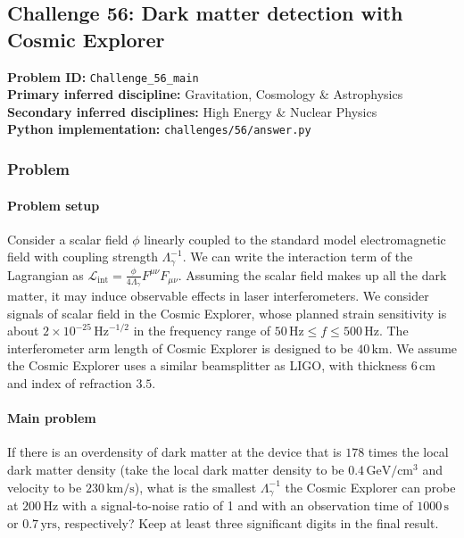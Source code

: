 \subsection[Challenge 56: Dark matter detection with Cosmic Explorer]{Challenge 56: Dark matter detection with Cosmic Explorer}
\textbf{Problem ID:} \texttt{Challenge\_56\_main}\\
\textbf{Primary inferred discipline:} Gravitation, Cosmology \& Astrophysics\\
\textbf{Secondary inferred disciplines:} High Energy \& Nuclear Physics\\
\textbf{Python implementation:} \texttt{challenges/56/answer.py}

\subsubsection*{Problem}
\paragraph*{Problem setup}
Consider a scalar field $\phi$ linearly coupled to the standard model electromagnetic field with coupling strength $\Lambda_\gamma^{-1}$. We can write the interaction term of the Lagrangian as $\mathcal{L}_\text{int}=\frac{\phi}{4 \Lambda_\gamma}F^{\mu\nu}F_{\mu\nu}$. Assuming the scalar field makes up all the dark matter, it may induce observable effects in laser interferometers. We consider signals of scalar field in the Cosmic Explorer, whose planned strain sensitivity is about $2\times 10^{-25}\, \text{Hz}^{-1/2}$ in the frequency range of $50\,\text{Hz} \leq f \leq 500\,\text{Hz}$. The interferometer arm length of Cosmic Explorer is designed to be $40\, \text{km}$. We assume the Cosmic Explorer uses a similar beamsplitter as LIGO, with thickness $6\,\text{cm}$ and index of refraction $3.5$.

\paragraph*{Main problem}

If there is an overdensity of dark matter at the device that is $178$ times the local dark matter density (take the local dark matter density to be $0.4\,\text{GeV}/\text{cm}^3$ and velocity to be $230\,\text{km}/\text{s}$), what is the smallest $\Lambda_\gamma^{-1}$ the Cosmic Explorer can probe at $200\,\text{Hz}$ with a signal-to-noise ratio of 1 and with an observation time of $1000\,\text{s}$ or $0.7\,\text{yrs}$, respectively? Keep at least three significant digits in the final result.


